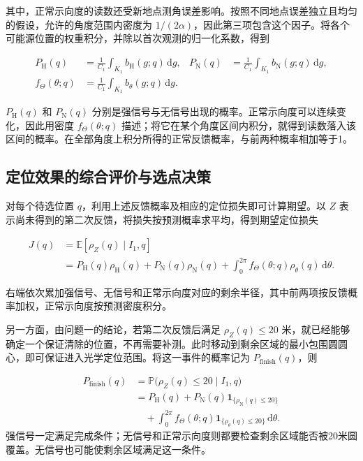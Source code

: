 \documentclass[UTF8,a4paper,zihao=-4,fontset=none]{ctexart}
\begin{document}
其中，正常示向度的读数还受新地点测角误差影响。按照不同地点误差独立且均匀的假设，允许的角度范围内密度为 \(1/(2\alpha)\)，因此第三项包含这个因子。将各个可能源位置的权重积分，并除以首次观测的归一化系数，得到

\begin{equation}
\begin{aligned}
 P_{\mathrm H}(q)&=\frac{1}{C_1}\int_{K_1}b_{\mathrm H}(g;q)\,\mathrm dg,
 &P_{\mathrm N}(q)&=\frac{1}{C_1}\int_{K_1}b_{\mathrm N}(g;q)\,\mathrm dg,\\
 f_\Theta(\theta;q)&=\frac{1}{C_1}\int_{K_1}b_\theta(g;q)\,\mathrm dg.
\end{aligned}
\label{eq:q2-pair-prediction}
\end{equation}

\(P_{\mathrm H}(q)\) 和 \(P_{\mathrm N}(q)\) 分别是强信号与无信号出现的概率。正常示向度可以连续变化，因此用密度 \(f_\Theta(\theta;q)\) 描述；将它在某个角度区间内积分，就得到读数落入该区间的概率。在全部角度上积分所得的正常反馈概率，与前两种概率相加等于1。

\subsection{定位效果的综合评价与选点决策}

对每个待选位置 \(q\)，利用上述反馈概率及相应的定位损失即可计算期望。以 \(Z\) 表示尚未得到的第二次反馈，将损失按预测概率求平均，得到期望定位损失

\begin{equation}
\begin{aligned}
 J(q)&=\mathbb E[\rho_Z(q)\mid I_1,q]\\
 &=P_{\mathrm H}(q)\rho_{\mathrm H}(q)+P_{\mathrm N}(q)\rho_{\mathrm N}(q)
 +\int_0^{2\pi}f_\Theta(\theta;q)\rho_\theta(q)\,\mathrm d\theta.
\end{aligned}
\label{eq:q2-pair-expected-objective}
\end{equation}

右端依次累加强信号、无信号和正常示向度对应的剩余半径，其中前两项按反馈概率加权，正常示向度按预测密度积分。

另一方面，由问题一的结论，若第二次反馈后满足 \(\rho_Z(q)\le20\) 米，就已经能够确定一个保证清除的位置，不再需要补测。此时移动到剩余区域的最小包围圆圆心，即可保证进入光学定位范围。将这一事件的概率记为 \(P_{\mathrm{finish}}(q)\)，则

\begin{equation}
\begin{aligned}
 P_{\mathrm{finish}}(q)
 &=\mathbb{P}\bigl(\rho_Z(q)\le20\mid I_1,q\bigr)\\
 &=P_{\mathrm H}(q)+P_{\mathrm N}(q)\mathbf1_{\{\rho_{\mathrm N}(q)\le20\}}\\
 &\quad+\int_0^{2\pi}f_\Theta(\theta;q)\mathbf1_{\{\rho_\theta(q)\le20\}}\,\mathrm d\theta.
\end{aligned}
\label{eq:q2-completion-probability}
\end{equation}
强信号一定满足完成条件；无信号和正常示向度则都要检查剩余区域能否被20米圆覆盖。无信号也可能使剩余区域满足这一条件。
\end{document}
